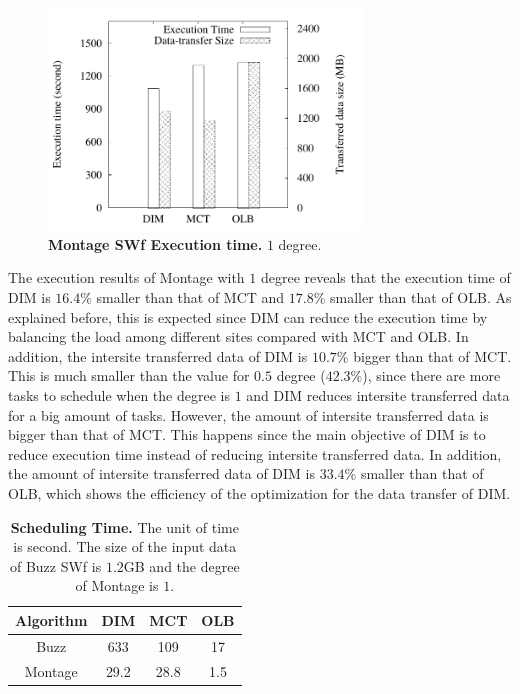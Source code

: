 \begin{figure}
\begin{centering}
\captionsetup{justification=centering}
\includegraphics[width=84mm]{figures/montage1}
\par\end{centering}
\caption{\textbf{Montage SWf Execution time.} $1$ degree.}
\label{fig:Montage8}
\end{figure}

The execution results of Montage with $1$ degree reveals that the execution time of DIM is $16.4\%$ smaller than that of MCT and $17.8\%$ smaller than that of OLB. As explained before, this is expected since DIM can reduce the execution time by balancing the load among different sites compared with MCT and OLB. In addition, the intersite transferred data of DIM is $10.7\%$ bigger than that of MCT. This is much smaller than the value for $0.5$ degree ($42.3\%$), since there are more tasks to schedule when the degree is $1$ and DIM reduces intersite transferred data for a big amount of tasks. However, the amount of intersite transferred data is bigger than that of MCT. This happens since the main objective of DIM is to reduce execution time instead of reducing intersite transferred data. In addition, the amount of intersite transferred data of DIM is $33.4\%$ smaller than that of OLB, which shows the efficiency of the optimization for the data transfer of DIM.

\begin{table}[htb]
\caption{\textbf{Scheduling Time. } The unit of time is second. The size of the input data of Buzz SWf is $1.2$GB and the degree of Montage is $1$\protect\footnotemark .}
\label{tab:ST}
\begin{centering}
\captionsetup{justification=centering}
\begin{tabular}{|c|c|c|c|}
\hline 
Algorithm & DIM & MCT & OLB \tabularnewline
\hline 
Buzz & 633 & 109 & 17 \tabularnewline
Montage & 29.2 & 28.8 & 1.5 \tabularnewline
\hline 
\end{tabular}
\par\end{centering} 
\end{table}

